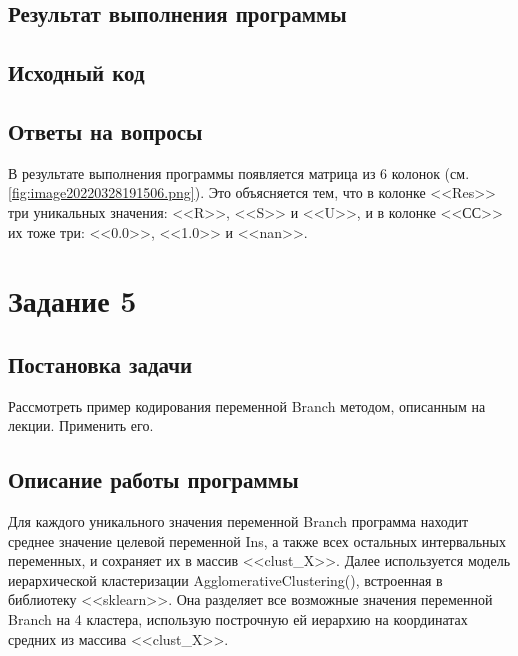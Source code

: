 \documentclass[12pt,a4paper]{article}
\begin{document}
  \subsection{Результат выполнения программы}

  \subsection{Исходный код}
\begin{Shaded}
\begin{Highlighting}[]

\OperatorTok{=}\NormalTok{ ColumnTransformer([}
\NormalTok{  (}
\NormalTok{], remainder}\OperatorTok{=}\NormalTok{)}

\NormalTok{OneHotEncoder().fit\_transform(X\_train[[}\NormalTok{, }\NormalTok{]]).todense()}
\end{Highlighting}
\end{Shaded}

  \subsection{Ответы на вопросы}
  В результате выполнения программы появляется матрица из 6 колонок (см. \autoref{fig:image20220328191506.png}).
  Это объясняется тем, что в колонке <<Res>> три уникальных значения: <<R>>, <<S>> и <<U>>,
  и в колонке <<СС>> их тоже три: <<0.0>>, <<1.0>> и <<nan>>.

  \newpage
  \section{Задание 5}
  \subsection{Постановка задачи}
  Рассмотреть пример кодирования переменной Branch методом, описанным на лекции. Применить его.

  \subsection{Описание работы программы}
  Для каждого уникального значения переменной Branch программа находит среднее значение целевой переменной Ins,
  а также всех остальных интервальных переменных, и сохраняет их в массив <<clust\_X>>.
  Далее используется модель иерархической кластеризации AgglomerativeClustering(), встроенная в библиотеку <<sklearn>>.
  Она разделяет все возможные значения переменной Branch на 4 кластера,
  использую построчную ей иерархию на координатах средних из массива <<clust\_X>>.
\end{document}

